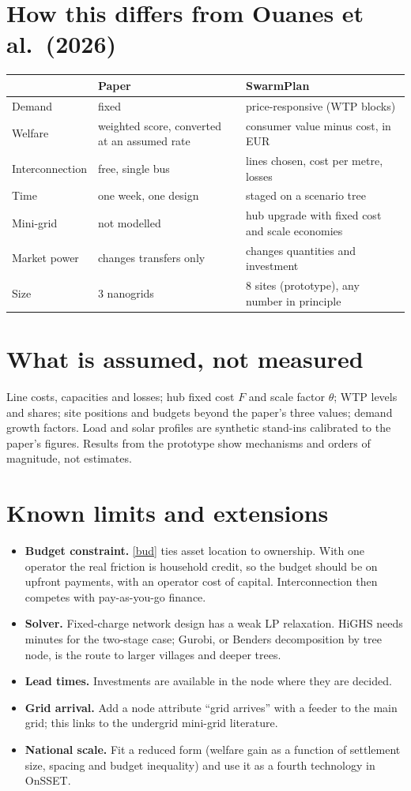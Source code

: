 \documentclass[11pt,a4paper]{article}
\begin{document}
\section{How this differs from Ouanes et al.\ (2026)}
\begin{tabular}{@{}p{3.2cm}p{5.6cm}p{6.6cm}@{}}
\toprule
 & Paper & SwarmPlan\\
\midrule
Demand & fixed & price-responsive (WTP blocks)\\
Welfare & weighted score, converted at an assumed rate & consumer value minus cost, in EUR\\
Interconnection & free, single bus & lines chosen, cost per metre, losses\\
Time & one week, one design & staged on a scenario tree\\
Mini-grid & not modelled & hub upgrade with fixed cost and scale economies\\
Market power & changes transfers only & changes quantities and investment\\
Size & 3 nanogrids & 8 sites (prototype), any number in principle\\
\bottomrule
\end{tabular}

\section{What is assumed, not measured}
Line costs, capacities and losses; hub fixed cost $F$ and scale factor $\theta$; WTP levels and
shares; site positions and budgets beyond the paper's three values; demand growth factors. Load and
solar profiles are synthetic stand-ins calibrated to the paper's figures. Results from the prototype
show mechanisms and orders of magnitude, not estimates.

\section{Known limits and extensions}
\begin{itemize}
  \item \textbf{Budget constraint.} \eqref{bud} ties asset location to ownership. With one operator the
        real friction is household credit, so the budget should be on upfront payments, with an
        operator cost of capital. Interconnection then competes with pay-as-you-go finance.
  \item \textbf{Solver.} Fixed-charge network design has a weak LP relaxation. HiGHS needs minutes for
        the two-stage case; Gurobi, or Benders decomposition by tree node, is the route to larger
        villages and deeper trees.
  \item \textbf{Lead times.} Investments are available in the node where they are decided.
  \item \textbf{Grid arrival.} Add a node attribute ``grid arrives'' with a feeder to the main grid;
        this links to the undergrid mini-grid literature.
  \item \textbf{National scale.} Fit a reduced form (welfare gain as a function of settlement size,
        spacing and budget inequality) and use it as a fourth technology in OnSSET.
\end{itemize}
\end{document}
